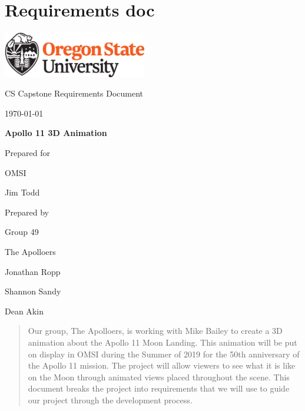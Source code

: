 \documentclass[onecolumn, draftclsnofoot,10pt, compsoc]{IEEEtran}
\def \CapstoneTeamName{		    The Apolloers}
\def \CapstoneTeamNumber{		49}
\def \GroupMemberOne{			Jonathan Ropp}
\def \GroupMemberTwo{			Shannon Sandy}
\def \GroupMemberThree{			Dean Akin}
\def \CapstoneProjectName{		Apollo 11 3D Animation}
\def \CapstoneSponsorCompany{	OMSI}
\def \CapstoneSponsorPersona{	Jim Todd}
\newcommand{\NameSigPair}[1]{\par
\makebox[2.75in][r]{#1} \hfil 	\makebox[3.25in]{\makebox[2.25in]{\hrulefill} \hfill		\makebox[.75in]{\hrulefill}}
\par\vspace{-12pt} \textit{\tiny\noindent
\makebox[2.75in]{} \hfil		\makebox[3.25in]{\makebox[2.25in][r]{Signature} \hfill	\makebox[.75in][r]{Date}}}}
\renewcommand{\NameSigPair}[1]{#1}
\begin{document}
\section{Requirements doc}
\begin{titlepage}
    \begin{singlespace}
        \hfill 
        \includegraphics[height=2cm]{OSU_horizontal_2C_O_over_B.eps}   
        \par\vspace{.2in}
        \centering
        \scshape{
            \huge CS Capstone Requirements Document \par
            {\large\today}\par
            \vspace{.5in}
            \textbf{\Huge\CapstoneProjectName}\par
            \vfill
            {\large Prepared for}\par
            \Huge \CapstoneSponsorCompany\par
            \vspace{5pt}
            {\Large\NameSigPair{\CapstoneSponsorPersona}\par}
            {\large Prepared by }\par
            Group\CapstoneTeamNumber\par
            \CapstoneTeamName\par 
            \vspace{5pt}
            {\Large
                \NameSigPair{\GroupMemberOne}\par
                \NameSigPair{\GroupMemberTwo}\par
                \NameSigPair{\GroupMemberThree}\par
            }
            \vspace{20pt}
        }
        \begin{abstract}
        	Our group, The Apolloers, is working with Mike Bailey to create a 3D animation about the Apollo 11 Moon Landing. This animation will be put on display in OMSI during the Summer of 2019 for the 50th anniversary of the Apollo 11 mission. The project will allow viewers to see what it is like on the Moon through animated views placed throughout the scene. This document breaks the project into requirements that we will use to guide our project through the development process. 
        \end{abstract}     
    \end{singlespace}
\end{titlepage}
\newpage
{}
\tableofcontents
\end{document}
